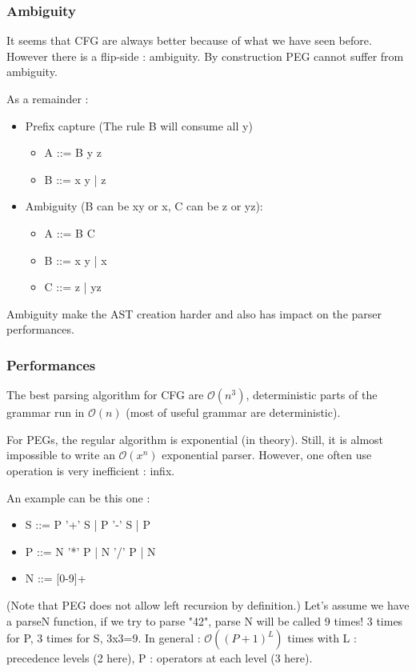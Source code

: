         \subsubsection{Ambiguity}
            It seems that CFG are always better because of what we have seen
            before. However there is a flip-side : ambiguity. By construction
            PEG cannot suffer from ambiguity.
            
            As a remainder : 
            \begin{itemize}
                \item Prefix capture (The rule B will consume all y)
                \begin{itemize}
                    \item A ::= B y z
                    \item B ::= x y | z
                \end{itemize} 
                \item Ambiguity (B can be xy or x, C can be z or yz): 
                \begin{itemize}
                    \item A ::= B C
                    \item B ::= x y | x
                    \item C ::= z | yz
                \end{itemize}
            \end{itemize}
            Ambiguity make the AST creation harder and also has impact on the
            parser performances.
        \subsubsection{Performances}
            The best parsing algorithm for CFG are $\mathcal{O}(n^3)$,
            deterministic parts of the grammar run in $\mathcal{O}(n)$ (most of
            useful grammar are deterministic).
            
            For PEGs, the regular algorithm is exponential (in theory). Still,
            it is almost impossible to write an $ \mathcal{O}(x^n)$ exponential
            parser. However, one often use operation is very inefficient : infix.

            An example can be this one : 
            \begin{itemize}
                \item S ::= P '+' S | P '-' S | P
                \item P ::= N '*' P | N '/' P | N
                \item N ::= [0-9]+
            \end{itemize}
            (Note that PEG does not allow left recursion by definition.) Let's
            assume we have a parseN function, if we try to parse "42", parse N
            will be called 9 times! 3 times for P, 3 times for S, 3x3=9. In
            general : $\mathcal{O}((P+1)^L)$ times with L : precedence levels (2
            here), P : operators at each level (3 here). 

